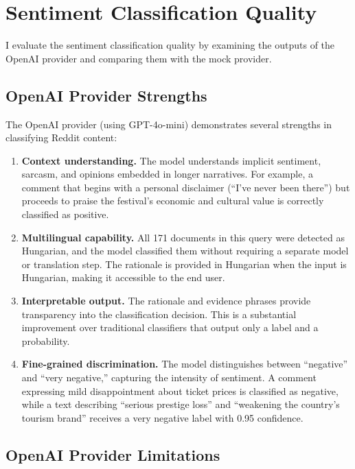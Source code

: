 \section{Sentiment Classification Quality}
\label{sec:classification_quality}

I evaluate the sentiment classification quality by examining the outputs of the OpenAI provider and comparing them with the mock provider.

\subsection{OpenAI Provider Strengths}

The OpenAI provider (using GPT-4o-mini) demonstrates several strengths in classifying Reddit content:

\begin{enumerate}
    \item \textbf{Context understanding.} The model understands implicit sentiment, sarcasm, and opinions embedded in longer narratives. For example, a comment that begins with a personal disclaimer (``I've never been there'') but proceeds to praise the festival's economic and cultural value is correctly classified as positive.

    \item \textbf{Multilingual capability.} All 171 documents in this query were detected as Hungarian, and the model classified them without requiring a separate model or translation step. The rationale is provided in Hungarian when the input is Hungarian, making it accessible to the end user.

    \item \textbf{Interpretable output.} The rationale and evidence phrases provide transparency into the classification decision. This is a substantial improvement over traditional classifiers that output only a label and a probability.

    \item \textbf{Fine-grained discrimination.} The model distinguishes between ``negative'' and ``very negative,'' capturing the intensity of sentiment. A comment expressing mild disappointment about ticket prices is classified as negative, while a text describing ``serious prestige loss'' and ``weakening the country's tourism brand'' receives a very negative label with 0.95 confidence.
\end{enumerate}

\subsection{OpenAI Provider Limitations}

